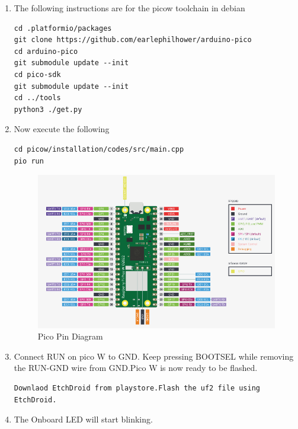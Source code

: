 \begin{enumerate}[label=\arabic*.,ref=\theenumi]
	\item The following instructions are for the picow toolchain
		in debian
\begin{lstlisting}
cd .platformio/packages
git clone https://github.com/earlephilhower/arduino-pico
cd arduino-pico
git submodule update --init
cd pico-sdk
git submodule update --init
cd ../tools
python3 ./get.py
\end{lstlisting}
\item Now execute the following 
\begin{lstlisting}
cd picow/installation/codes/src/main.cpp
pio run
\end{lstlisting}
		\begin{figure}
			\centering
    \includegraphics[width=\columnwidth]{picow/installation/figs/picowpinout.jpg}
    \caption{Pico Pin Diagram} %
			\label{fig:picowpinout}
		\end{figure}
\item Connect RUN on pico W to GND. Keep pressing BOOTSEL while removing the RUN-GND wire from GND.Pico W is now ready to be flashed.
\begin{lstlisting}
Downlaod EtchDroid from playstore.Flash the uf2 file using EtchDroid.
\end{lstlisting}
\item The Onboard LED will start blinking.
\end{enumerate}





